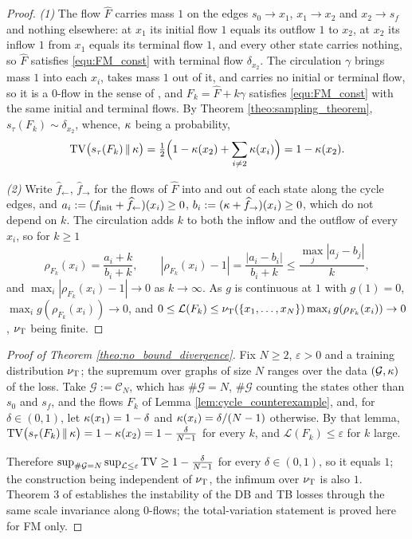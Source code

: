 \begin{proof}
\emph{(1)} The flow $\widehat F$ carries mass $1$ on the edges $s_0\rightarrow x_1$, $x_1\rightarrow x_2$ and $x_2\rightarrow s_f$ and nothing elsewhere: at $x_1$ its initial flow $1$ equals its outflow $1$ to $x_2$, at $x_2$ its inflow $1$ from $x_1$ equals its terminal flow $1$, and every other state carries nothing, so $\widehat F$ satisfies \eqref{equ:FM_const} with terminal flow $\delta_{x_2}$. The circulation $\gamma$ brings mass $1$ into each $x_i$, takes mass $1$ out of it, and carries no initial or terminal flow, so it is a $0$-flow in the sense of \citet{brunswic2024theory}, and $F_k=\widehat F+k\gamma$ satisfies \eqref{equ:FM_const} with the same initial and terminal flows. By Theorem \ref{theo:sampling_theorem}, $s_\tau(F_k)\sim\delta_{x_2}$, whence, $\kappa$ being a probability,
\begin{equation*}
    \mathrm{TV}\bigl(s_\tau(F_k)\,\|\,\kappa\bigr)=\tfrac12\Bigl(1-\kappa(x_2)+\sum_{i\neq2}\kappa(x_i)\Bigr)=1-\kappa(x_2).
\end{equation*}

\emph{(2)} Write $\widehat f_\leftarrow$, $\widehat f_\rightarrow$ for the flows of $\widehat F$ into and out of each state along the cycle edges, and $a_i:=(f_{\mathrm{init}}+\widehat f_\leftarrow)(x_i)\geq0$, $b_i:=(\kappa+\widehat f_\rightarrow)(x_i)\geq0$, which do not depend on $k$. The circulation adds $k$ to both the inflow and the outflow of every $x_i$, so for $k\geq1$
\begin{equation*}
    \rho_{F_k}(x_i)=\frac{a_i+k}{b_i+k},\qquad |\rho_{F_k}(x_i)-1|=\frac{|a_i-b_i|}{b_i+k}\leq\frac{\max_j|a_j-b_j|}{k},
\end{equation*}
and $\max_i|\rho_{F_k}(x_i)-1|\rightarrow0$ as $k\rightarrow\infty$. As $g$ is continuous at $1$ with $g(1)=0$, $\max_ig(\rho_{F_k}(x_i))\rightarrow0$, and $0\leq\mathcal L(F_k)\leq\nu_{\mathrm{T}}(\{x_1,\dots,x_N\})\max_ig(\rho_{F_k}(x_i))\rightarrow0$, $\nu_{\mathrm{T}}$ being finite.
\end{proof}

\begin{proof}[Proof of Theorem \ref{theo:no_bound_divergence}]
Fix $N\geq2$, $\varepsilon>0$ and a training distribution $\nu_{\mathrm{T}}$; the supremum over graphs of size $N$ ranges over the data $(\mathcal G,\kappa)$ of the loss. Take $\mathcal G:=\mathcal C_N$, which has $\#\mathcal G=N$, $\#\mathcal G$ counting the states other than $s_0$ and $s_f$, and the flows $F_k$ of Lemma \ref{lem:cycle_counterexample}, and, for $\delta\in(0,1)$, let $\kappa(x_1)=1-\delta$ and $\kappa(x_i)=\delta/(N-1)$ otherwise. By that lemma, $\mathrm{TV}\bigl(s_\tau(F_k)\,\|\,\kappa\bigr)=1-\kappa(x_2)=1-\frac{\delta}{N-1}$ for every $k$, and $\mathcal L(F_k)\leq\varepsilon$ for $k$ large.

Therefore $\sup_{\#\mathcal G=N}\sup_{\mathcal L\leq\varepsilon}\mathrm{TV} \geq 1-\frac{\delta}{N-1}$ for every $\delta\in(0,1)$, so it equals $1$; the construction being independent of $\nu_{\mathrm{T}}$, the infimum over $\nu_{\mathrm{T}}$ is also $1$. Theorem 3 of \citet{brunswic2024theory} establishes the instability of the DB and TB losses through the same scale invariance along $0$-flows; the total-variation statement is proved here for FM only.
\end{proof}

